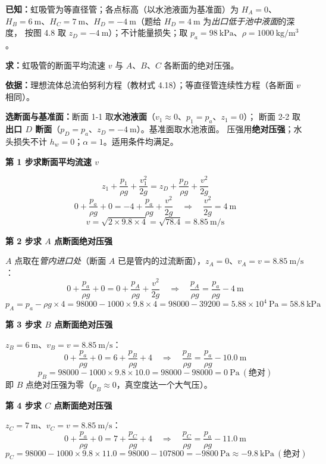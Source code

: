\begin{jie}
\textbf{已知：}虹吸管为等直径管；各点标高（以水池液面为基准面）为
$H_A=0$、$H_B=6\ \mathrm{m}$、$H_C=7\ \mathrm{m}$、$H_D=-4\ \mathrm{m}$（题给 $H_D=4\ \mathrm{m}$ 为\emph{出口低于池中液面}的深度，
按图 4.8 取 $z_D=-4\ \mathrm{m}$）；不计能量损失；取 $p_a=98\ \mathrm{kPa}$、$\rho=1000\ \mathrm{kg/m^3}$。

\textbf{求：}虹吸管的断面平均流速 $v$ 与 $A$、$B$、$C$ 各断面的绝对压强。

\textbf{依据：}理想流体总流伯努利方程（教材式 4.18）；等直径管连续性方程（各断面 $v$ 相同）。

\textbf{选断面与基准面：}断面 1-1 取\textbf{水池液面}（$v_1\approx0$、$p_1=p_a$、$z_1=0$）；
断面 2-2 取\textbf{出口 $D$ 断面}（$p_D=p_a$、$z_D=-4\ \mathrm{m}$）。基准面取水池液面。
压强用\textbf{绝对压强}；水头损失不计 $h_w=0$；$\alpha=1$。适用条件均满足。

\textbf{第 1 步\quad 求断面平均流速 $v$}

\[ z_1+\frac{p_1}{\rho g}+\frac{v_1^2}{2g}=z_D+\frac{p_D}{\rho g}+\frac{v^2}{2g} \]
\[ 0+\frac{p_a}{\rho g}+0=-4+\frac{p_a}{\rho g}+\frac{v^2}{2g}
   \quad\Longrightarrow\quad \frac{v^2}{2g}=4\ \mathrm{m} \]
\[ v=\sqrt{2\times9.8\times4}=\sqrt{78.4}=8.85\ \mathrm{m/s} \]

\textbf{第 2 步\quad 求 $A$ 点断面绝对压强}

$A$ 点取在\emph{管内进口处}（断面 $A$ 已是管内的过流断面），$z_A=0$、$v_A=v=8.85\ \mathrm{m/s}$：
\[ 0+\frac{p_a}{\rho g}+0=0+\frac{p_A}{\rho g}+\frac{v^2}{2g}
   \quad\Longrightarrow\quad \frac{p_A}{\rho g}=\frac{p_a}{\rho g}-4\ \mathrm{m} \]
\[ p_A=p_a-\rho g\times4=98000-1000\times9.8\times4=98000-39200=5.88\times10^4\ \mathrm{Pa}=58.8\ \mathrm{kPa} \]

\textbf{第 3 步\quad 求 $B$ 点断面绝对压强}

$z_B=6\ \mathrm{m}$、$v_B=v=8.85\ \mathrm{m/s}$：
\[ 0+\frac{p_a}{\rho g}+0=6+\frac{p_B}{\rho g}+4
   \quad\Longrightarrow\quad \frac{p_B}{\rho g}=\frac{p_a}{\rho g}-10.0\ \mathrm{m} \]
\[ p_B=98000-1000\times9.8\times10.0=98000-98000=0\ \mathrm{Pa}\ (\text{绝对}) \]
即 $B$ 点绝对压强为零（$p_B\approx0$，真空度达一个大气压）。

\textbf{第 4 步\quad 求 $C$ 点断面绝对压强}

$z_C=7\ \mathrm{m}$、$v_C=v=8.85\ \mathrm{m/s}$：
\[ 0+\frac{p_a}{\rho g}+0=7+\frac{p_C}{\rho g}+4
   \quad\Longrightarrow\quad \frac{p_C}{\rho g}=\frac{p_a}{\rho g}-11.0\ \mathrm{m} \]
\[ p_C=98000-1000\times9.8\times11.0=98000-107800=-9800\ \mathrm{Pa}\approx-9.8\ \mathrm{kPa}\ (\text{绝对}) \]


\end{jie}
